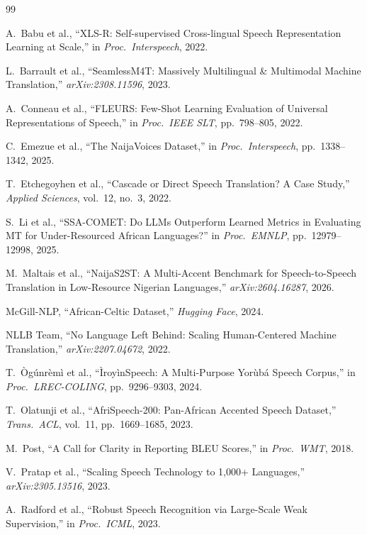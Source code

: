 \documentclass[10pt,twocolumn]{article}
\begin{document}
\balance

\begin{thebibliography}{99}

A.~Babu et al.,
``XLS-R: Self-supervised Cross-lingual Speech Representation
Learning at Scale,''
in \textit{Proc.\ Interspeech}, 2022.

L.~Barrault et al.,
``SeamlessM4T: Massively Multilingual \& Multimodal Machine
Translation,''
\textit{arXiv:2308.11596}, 2023.

A.~Conneau et al.,
``FLEURS: Few-Shot Learning Evaluation of Universal
Representations of Speech,''
in \textit{Proc.\ IEEE SLT}, pp.~798--805, 2022.

C.~Emezue et al.,
``The NaijaVoices Dataset,''
in \textit{Proc.\ Interspeech}, pp.~1338--1342, 2025.

T.~Etchegoyhen et al.,
``Cascade or Direct Speech Translation? A Case Study,''
\textit{Applied Sciences}, vol.~12, no.~3, 2022.

S.~Li et al.,
``SSA-COMET: Do LLMs Outperform Learned Metrics in Evaluating MT
for Under-Resourced African Languages?''
in \textit{Proc.\ EMNLP}, pp.~12979--12998, 2025.

M.~Maltais et al.,
``NaijaS2ST: A Multi-Accent Benchmark for Speech-to-Speech
Translation in Low-Resource Nigerian Languages,''
\textit{arXiv:2604.16287}, 2026.

McGill-NLP,
``African-Celtic Dataset,''
\textit{Hugging Face}, 2024.

NLLB Team,
``No Language Left Behind: Scaling Human-Centered Machine
Translation,''
\textit{arXiv:2207.04672}, 2022.

T.~\`{O}g\'{u}nr\`{e}m\`{i} et al.,
``\`{I}roy\`{i}nSpeech: A Multi-Purpose Yor\`{u}b\'{a}
Speech Corpus,''
in \textit{Proc.\ LREC-COLING}, pp.~9296--9303, 2024.

T.~Olatunji et al.,
``AfriSpeech-200: Pan-African Accented Speech Dataset,''
\textit{Trans.\ ACL}, vol.~11, pp.~1669--1685, 2023.

M.~Post,
``A Call for Clarity in Reporting BLEU Scores,''
in \textit{Proc.\ WMT}, 2018.

V.~Pratap et al.,
``Scaling Speech Technology to 1,000+ Languages,''
\textit{arXiv:2305.13516}, 2023.

A.~Radford et al.,
``Robust Speech Recognition via Large-Scale Weak
Supervision,''
in \textit{Proc.\ ICML}, 2023.

\end{thebibliography}
\end{document}
